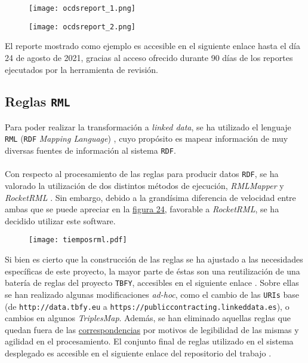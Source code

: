         \begin{figure}[h]
            \centering
            \texttt{[image: ocdsreport\_1.png]}
        \end{figure}
        
        \begin{figure}[h]
            \centering
            \texttt{[image: ocdsreport\_2.png]}
        \end{figure}
        
        El reporte mostrado como ejemplo es accesible en el siguiente enlace \cite{OCDSREPORT} hasta el día 24 de agosto de 2021, gracias al acceso ofrecido durante 90 días de los reportes ejecutados por la herramienta de revisión.
        
    \subsection{Reglas \texttt{RML}}
        Para poder realizar la transformación a \textit{linked data}, se ha utilizado el lenguaje \texttt{RML} (\texttt{RDF} \textit{Mapping Language}) \cite{RML}, cuyo propósito es mapear información de muy diversas fuentes de información al sistema \texttt{RDF}.
        \\ \\
        Con respecto al procesamiento de las reglas para producir datos \texttt{RDF}, se ha valorado la utilización de dos distintos métodos de ejecución, \textit{RMLMapper} \cite{RMLMAPPER} y \textit{RocketRML} \cite{ROCKETRML}. Sin embargo, debido a la grandísima diferencia de velocidad entre ambas que se puede apreciar en la \hyperref[fig:tiemposrml]{figura 24}, favorable a \textit{RocketRML}, se ha decidido utilizar este software.
        
        \begin{figure}[!htb]
            \centering
            \texttt{[image: tiemposrml.pdf]}
            \label{fig:tiemposrml}
        \end{figure}
        
        \noindent Si bien es cierto que la construcción de las reglas se ha ajustado a las necesidades específicas de este proyecto, la mayor parte de éstas son una reutilización de una batería de reglas del proyecto \texttt{TBFY}, accesibles en el siguiente enlace \cite{OPENOPPSMAP}. Sobre ellas se han realizado algunas modificaciones \textit{ad-hoc}, como el cambio de las \texttt{URIs} base (de \texttt{http://data.tbfy.eu} a \texttt{https://publiccontracting.linkeddata.es}), o cambios en algunos \textit{TriplesMap}. Además, se han eliminado aquellas reglas que quedan fuera de las \hyperref[sec:correspondencias]{correspondencias} por motivos de legibilidad de las mismas y agilidad en el procesamiento. El conjunto final de reglas utilizado en el sistema desplegado es accesible en el siguiente enlace del repositorio del trabajo \cite{MYMAP}.
        
